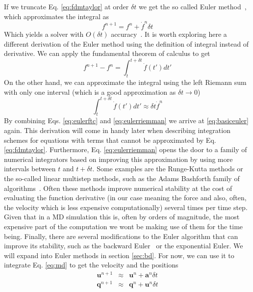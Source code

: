 \documentclass[ twoside,openright,titlepage,numbers=noenddot,%
headinclude,footinclude,cleardoublepage=empty,abstract=on,
BCOR=5mm,paper=b5,fontsize=11pt, dvipsnames
]{scrreprt}
\renewcommand{\vec}[1]{\bm{#1}}
\newcommand{\dt}{\delta t}
\newcommand{\ppos}{q}
\newcommand{\pvel}{u}
\begin{document}
If we truncate Eq. \eqref{eq:fdmtaylor} at order $\dt$ we get the so called Euler method~\cite{Butcher2016}, which approximates the integral as
\begin{equation}
  \label{eq:basiceuler}
  f^{n+1} = f^n + \dot{f}^n\dt
\end{equation}
Which yields a solver with $O(\dt)$ accuracy~\cite{Butcher2016}.
It is worth exploring here a different derivation of the Euler method using the definition of integral instead of derivative. We can apply the fundamental theorem of calculus to get
\begin{equation}
  \label{eq:eulerftc}
  f^{n+1} - f^n = \int_t^{t+\dt}\dot{f}(t')dt'
\end{equation}
On the other hand, we can approximate the integral using the left Riemann sum with only one interval (which is a good approximation as $\dt\rightarrow 0$)
\begin{equation}
  \label{eq:eulerriemman}
  \int_t^{t+\dt}\dot{f}(t')dt' \approx \dt \dot{f}^n
\end{equation}
By combining Eqs. \eqref{eq:eulerftc} and \eqref{eq:eulerriemman} we arrive at \eqref{eq:basiceuler} again.
This derivation will come in handy later when describing integration schemes for equations with terms that cannot be approximated by Eq. \eqref{eq:fdmtaylor}.
Furthermore, Eq. \eqref{eq:eulerriemman} opens the door to a family of numerical integrators based on improving this approximation by using more intervals between $t$ and $t+\dt$. Some examples are the Runge-Kutta methods or the so-called linear multistep methods, such as the Adams Bashforth family of algorithms~\cite{Butcher2016}.
Often these methods improve numerical stability at the cost of evaluating the function derivative (in our case meaning the force and also, often, the velocity which is less expensive computationally) several times per time step. Given that in a \gls{MD} simulation this is, often by orders of magnitude, the most expensive part of the computation we wont be making use of them for the time being.
Finally, there are several modifications to the Euler algorithm that can improve its stability, such as the backward Euler~\cite{Butcher2016} or the exponential Euler\cite{Butcher2016}.
We will expand into Euler methods in section \ref{sec:bd}.
For now, we can use it to integrate Eq. \eqref{eq:md} to get the velocity and the positions
\begin{equation}
  \label{eq:basiceulermd}
  \begin{aligned}
  \vec{\pvel}^{n+1} &\approx& \vec{\pvel}^n + \vec{a}^n\dt\\
  \vec{\ppos}^{n+1} &\approx& \vec{\ppos}^n + \vec{\pvel}^n\dt
\end{aligned}
\end{equation}
\end{document}

